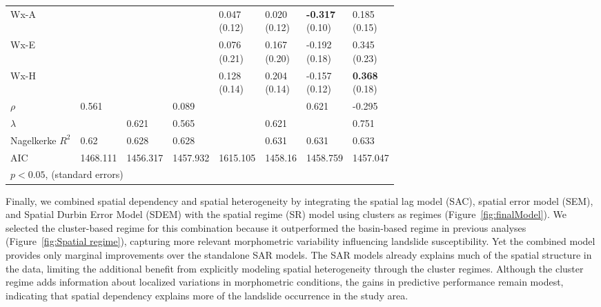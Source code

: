 \documentclass[lineno,pdflatex,sn-basic]{sn-jnl}%
\theoremstyle{thmstyleone}%
\theoremstyle{thmstyletwo}%
\theoremstyle{thmstylethree}%
\begin{document}
\begin{table}[ht]
\begin{tabular}{llllllll}
 Wx-A &  &  &  & \makecell{0.047 \\ (0.12)} & \makecell{0.020 \\ (0.12)} & \makecell{\textbf{-0.317} \\ (0.10)} & \makecell{0.185 \\ (0.15)} \\
 Wx-E &  &  &  & \makecell{0.076 \\ (0.21)} & \makecell{0.167 \\ (0.20)} & \makecell{-0.192 \\ (0.18)} & \makecell{0.345 \\ (0.23)} \\
 Wx-H &  &  &  & \makecell{0.128 \\ (0.14)} & \makecell{0.204 \\ (0.14)} & \makecell{-0.157 \\ (0.12)} & \makecell{\textbf{0.368} \\ (0.18)} \\
 \midrule
$\rho$ & 0.561 &  & 0.089 &  &  & 0.621 & -0.295 \\
$\lambda$ &  & 0.621 & 0.565 &  & 0.621 &  & 0.751 \\
 \midrule
Nagelkerke $R^2$ & 0.62 & 0.628 & 0.628 &  & 0.631 & 0.631 & 0.633 \\
 AIC & 1468.111 & 1456.317 & 1457.932 & 1615.105 & 1458.16 & 1458.759 & 1457.047 \\
\bottomrule
\multicolumn{3}{l}{\textbf{$p<0.05$}, (standard errors)}
 \end{tabular}
\end{table}


Finally, we combined spatial dependency and spatial heterogeneity by integrating the spatial lag model (SAC), spatial error model (SEM), and Spatial Durbin Error Model (SDEM) with the spatial regime (SR) model using clusters as regimes (Figure~\ref{fig:finalModel}). 
We selected the cluster-based regime for this combination because it outperformed the basin-based regime in previous analyses (Figure~\ref{fig:Spatial regime}), capturing more relevant morphometric variability influencing landslide susceptibility. 
Yet the combined model provides only marginal improvements over the standalone SAR models. 
The SAR models already explains much of the spatial structure in the data, limiting the additional benefit from explicitly modeling spatial heterogeneity through the cluster regimes. 
Although the cluster regime adds information about localized variations in morphometric conditions, the gains in predictive performance remain modest, indicating that spatial dependency explains more of the landslide occurrence in the study area.
\end{document}
